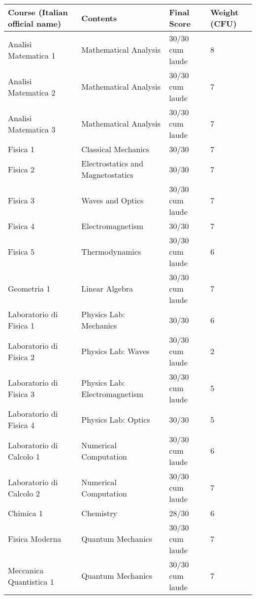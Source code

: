 \documentclass[11pt,letterpaper,sans]{moderncv}   %
\begin{document}
\vspace{-0.1cm}
{ \scriptsize
\begin{tabular*}{\linewidth}{l	@{\hspace{1.2cm}}l@{\hspace{1.2cm}}l@{\hspace{1.2cm}}l}
\textbf{Course (Italian official name)} &  \textbf{Contents}  &  \textbf{Final Score} & \textbf{Weight (CFU)}\\
\hline \hline
Analisi Matematica 1  					&  Mathematical Analysis	& 30/30 cum laude &8\\	
Analisi Matematica 2  					&  Mathematical Analysis	&  30/30 cum laude &7\\	
Analisi Matematica 3  					&  Mathematical Analysis	& 30/30 cum laude &7\\	
Fisica 1  								&  Classical Mechanics& 30/30 &7\\	
Fisica 2  								&  Electrostatics and Magnetostatics &   30/30   &7\\
Fisica 3  								&  Waves and Optics&   30/30 cum laude &7\\		
Fisica 4  								&  Electromagnetism  & 30/30  &7\\	
Fisica 5  								&  Thermodynamics &    30/30 cum laude&6\\	
Geometria	 1							&  Linear Algebra &    30/30 cum laude &7\\		
Laboratorio di Fisica 1					&  Physics Lab: Mechanics &  30/30 &6\\
Laboratorio di Fisica 2					&  Physics Lab: Waves&  30/30   cum laude &2\\	
Laboratorio di Fisica 3					&  Physics Lab: Electromagnetism&   30/30 cum laude  &5\\
Laboratorio di Fisica 4					&  Physics Lab: Optics&   30/30 &5\\	
Laboratorio di Calcolo 1					&  Numerical Computation&    30/30  cum laude &6\\	
Laboratorio di Calcolo 2					&  Numerical Computation&     30/30 cum laude &7\\	
Chimica 1								&  Chemistry &     28/30 &6\\	
Fisica Moderna 						&  Quantum Mechanics&  30/30  cum laude &7\\	
Meccanica Quantistica 1					&  Quantum Mechanics&   30/30  cum laude &7\\

\end{tabular*}}
\end{document}
